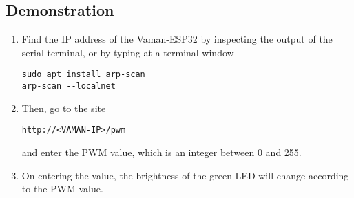 \subsection{Demonstration}
\begin{enumerate}
    \item Find the IP address of the Vaman-ESP32 by inspecting the output of the
    serial terminal, or by typing at a terminal window
    \begin{lstlisting}
sudo apt install arp-scan
arp-scan --localnet
    \end{lstlisting}
    \item Then, go to the site 
    \begin{lstlisting}
http://<VAMAN-IP>/pwm 
    \end{lstlisting}
    and enter the PWM value, which is an integer between 0 and 255.
    \item On entering the value, the brightness of the green LED will change 
    according to the PWM value.
\end{enumerate}